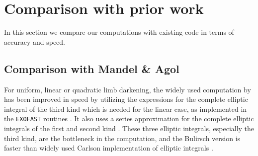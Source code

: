 \documentclass[modern]{aastex61}
\begin{document}
%
%
%
%

\section{Comparison with prior work} \label{sec:comparison}

In this section we compare our computations with existing code in terms
of accuracy and speed.

\subsection{Comparison with Mandel \& Agol}

For uniform, linear or quadratic limb darkening, the widely used computation
by \citet{MandelAgol2002} has been improved in speed by utilizing the
\citet{Bulirsch1965a,Bulirsch1965b} expressions for the complete elliptic
integral of the third kind which is needed for the linear case, as implemented
in the \texttt{EXOFAST} routines \citep{Eastman2013}.  It also uses a series 
approximation for the complete elliptic integrals of the first and second 
kind \citep{Hastings1955}. These three elliptic integrals, especially the third
kind, are the bottleneck in the computation, and the Bulirsch version is faster
than widely used Carlson implementation of elliptic integrals \citep{Carlson1979}.
\end{document}
